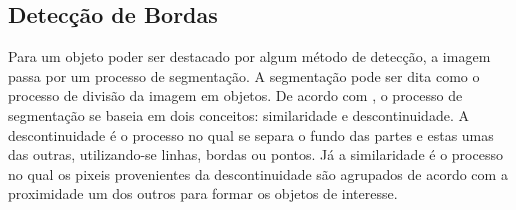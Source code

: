 


\subsection{Detecção de Bordas}
Para um objeto poder ser destacado por algum método de detecção, a imagem passa por um processo de segmentação. A segmentação pode ser dita como o processo de divisão da imagem em objetos\cite{Gonzalez:2008}. De acordo com , o processo de segmentação se baseia em dois conceitos: similaridade e descontinuidade. A descontinuidade é o processo no qual se separa o fundo das partes e estas umas das outras, utilizando-se linhas, bordas ou pontos. Já a similaridade é o processo no qual os pixeis provenientes da descontinuidade são agrupados de acordo com a proximidade um dos outros para formar os objetos de interesse. 

